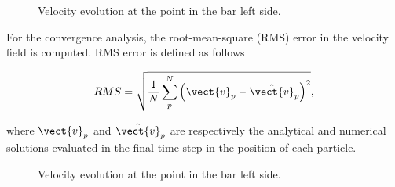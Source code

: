 \begin{figure}\sidecaption
  \centering
  \caption{Velocity evolution at the point in the bar left side.}
  \label{fig:Dyka-OTM-MPM}
\end{figure}

For the convergence analysis, the root-mean-square (RMS) error in the
velocity field is computed. RMS error is defined as follows

\begin{equation}
  \label{eq:RMS}
  RMS = \sqrt{\frac{1}{N} \sum^{N}_p \left( \vect{v}_p - \hat{\vect{v}}_p \right)^2},
\end{equation}

where $\vect{v}_p$ and $\hat{\vect{v}}_p$ are respectively the analytical and
numerical solutions evaluated in the final time step in the position
of each particle.


\begin{figure}\sidecaption
  \centering
  \caption{Velocity evolution at the point in the bar left side.}
  \label{fig:Dyka-error-evol}
\end{figure}


